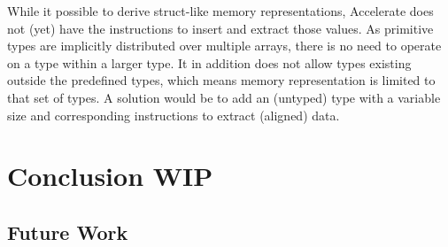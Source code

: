 \documentclass{article}
\begin{document}
While it possible to derive struct-like memory representations, Accelerate does not (yet) have the instructions to insert and extract those values.
As primitive types are implicitly distributed over multiple arrays, there is no need to operate on a type within a larger type. 
It in addition does not allow types existing outside the predefined types, which means memory representation is limited to that set of types.
A solution would be to add an (untyped) type with a variable size and corresponding instructions to extract (aligned) data.

\newpage

\section{Conclusion WIP}

\subsection{Future Work}

\newpage



\end{document}
